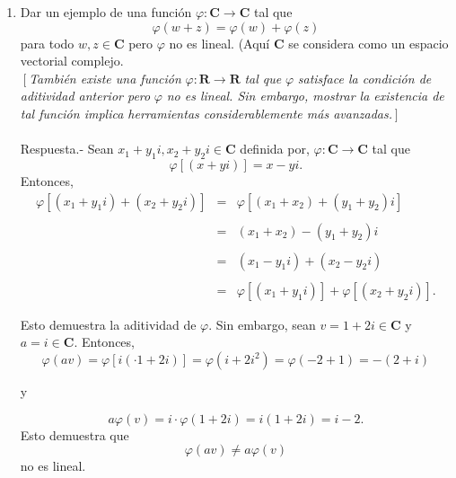 \begin{enumerate}[\bfseries 1.]
    \item Dar un ejemplo de una función $\varphi:\textbf{C}\to \textbf{C}$ tal que
    $$\varphi(w+z)=\varphi(w)+\varphi(z)$$
    para todo $w,z\in \textbf{C}$ pero $\varphi$ no es lineal. (Aquí \textbf{C} se considera como un espacio vectorial complejo.\\
    $\left[\right.$\textit{También existe una función} $\varphi:\textbf{R}\to \textbf{R}$  \textit{tal que} $\varphi$ \textit{satisface la condición de aditividad anterior pero} $\varphi$ \textit{no es lineal. Sin embargo, mostrar la existencia de tal función implica herramientas considerablemente más avanzadas.}$\left.\right]$\\\\
    Respuesta.-\; Sean $x_1+y_1i,x_2+y_2i\in \textbf{C}$ definida por, $\varphi:\textbf{C}\to \textbf{C}$ tal que
    $$\varphi\left[(x+yi)\right]=x-yi.$$
    Entonces,
    $$
    \begin{array}{rcl}
	\varphi\left[(x_1+y_1i)+(x_2+y_2i)\right] &=& \varphi\left[(x_1+x_2)+(y_1+y_2)i\right]\\\\
						  &=& (x_1+x_2)-(y_1+y_2)i\\\\
						  &=& (x_1-y_1i)+(x_2-y_2i)\\\\
						  &=& \varphi\left[(x_1+y_1i)\right]+\varphi\left[(x_2+y_2i)\right].
    \end{array}
    $$

    Esto demuestra la aditividad de $\varphi$. Sin embargo, sean $v=1+2i\in \textbf{C}$ y $a=i\in \textbf{C}$. Entonces,
    $$\varphi(av)=\varphi\left[i(\cdot 1+2i)\right]=\varphi\left(i+2i^2\right)=\varphi(-2+1)=-(2+i)$$
    \begin{center}
    y
    \end{center}
    $$a\varphi(v)=i\cdot \varphi(1+2i)=i(1+2i)=i-2.$$
    Esto demuestra que 
    $$\varphi(av)\neq a\varphi(v)$$
    no es lineal.\\\\



\end{enumerate}
